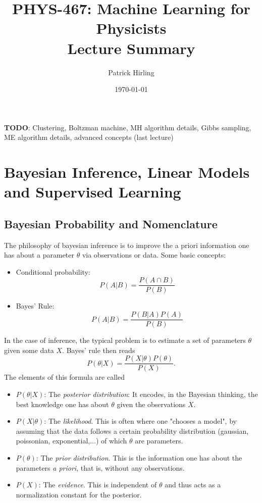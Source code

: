 \documentclass{article}
\title{PHYS-467: Machine Learning for Physicists\\\Large Lecture Summary}
\author{Patrick Hirling}
\date{\today}
\begin{document}
\maketitle
\tableofcontents

\noindent\textbf{TODO}: Clustering, Boltzman machine, MH algorithm details, Gibbs sampling, ME algorithm details, advanced concepts (last lecture)
\section{Bayesian Inference, Linear Models and Supervised Learning}
\subsection{Bayesian Probability and Nomenclature}
The philosophy of bayesian inference is to improve the a priori information one has about a parameter $\theta$ via observations or data.
Some basic concepts:
\begin{itemize}
    \item Conditional probability:
        \begin{equation}
            P(A|B) = \frac{P(A \cap B)}{P(B)}
        \end{equation}
    \item Bayes' Rule:
        \begin{equation}
            P(A|B) = \frac{P(B|A) P(A)}{P(B)}
        \end{equation}
\end{itemize}
In the case of inference, the typical problem is to estimate a set of parameters $\theta$ given some data $X$. Bayes' rule then reads
\begin{equation}
    P(\theta|X) = \frac{P(X|\theta) P(\theta)}{P(X)}.
\end{equation}
The elements of this formula are called
\begin{itemize}
    \item $P(\theta|X)$: The \emph{posterior distribution}: It encodes, in the Bayesian thinking, the best knowledge one has about $\theta$ given the observations $X$.
    \item $P(X|\theta)$: The \emph{likelihood}. This is often where one "chooses a model", by assuming that the data follows a certain probability distribution (gaussian, poissonian, exponential,...) of which $\theta$ are parameters.
    \item $P(\theta)$: The \emph{prior distribution}. This is the information one has about the parameters \emph{a priori}, that is, without any observations.
    \item $P(X)$: The \emph{evidence}. This is independent of $\theta$ and thus acts as a normalization constant for the posterior. 
\end{itemize}
\end{document}
